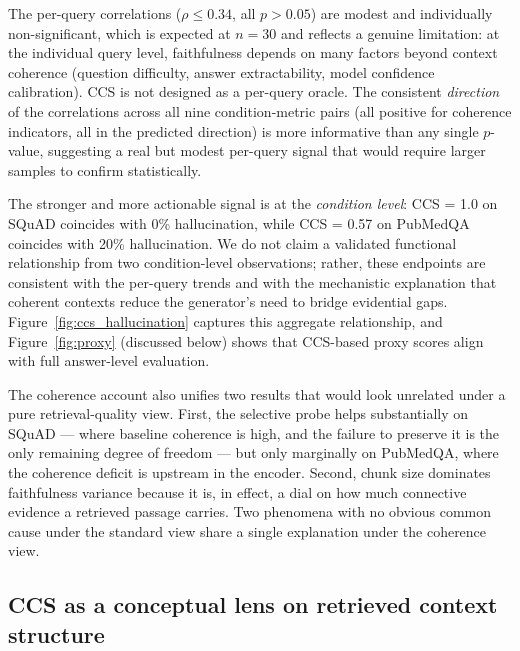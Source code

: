 The per-query correlations ($\rho \leq 0.34$, all $p > 0.05$) are modest
and individually non-significant, which is expected at $n = 30$ and
reflects a genuine limitation: at the individual query level, faithfulness
depends on many factors beyond context coherence (question difficulty,
answer extractability, model confidence calibration). CCS is not designed
as a per-query oracle. The consistent \emph{direction} of the correlations
across all nine condition-metric pairs (all positive for coherence
indicators, all in the predicted direction) is more informative than any
single $p$-value, suggesting a real but modest per-query signal that would
require larger samples to confirm statistically.

The stronger and more actionable signal is at the \emph{condition level}:
CCS = 1.0 on SQuAD coincides with 0\% hallucination, while CCS = 0.57 on
PubMedQA coincides with 20\% hallucination. We do not claim a validated
functional relationship from two condition-level observations; rather, these
endpoints are consistent with the per-query trends and with the mechanistic
explanation that coherent contexts reduce the generator's need to bridge
evidential gaps. Figure~\ref{fig:ccs_hallucination} captures this aggregate
relationship, and Figure~\ref{fig:proxy} (discussed below) shows that
CCS-based proxy scores align with full answer-level evaluation.

The coherence account also unifies two results that would look
unrelated under a pure retrieval-quality view. First, the selective
probe helps substantially on SQuAD — where baseline coherence is high,
and the failure to preserve it is the only remaining degree of freedom
— but only marginally on PubMedQA, where the coherence deficit is
upstream in the encoder. Second, chunk size dominates faithfulness
variance because it is, in effect, a dial on how much connective
evidence a retrieved passage carries. Two phenomena with no obvious
common cause under the standard view share a single explanation under
the coherence view.







\subsection{CCS as a conceptual lens on retrieved context structure}
\label{sec:ccs_lens}

